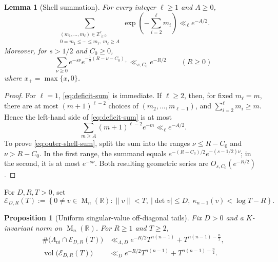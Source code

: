 \documentclass[reqno,11pt]{amsart}
\numberwithin{equation}{section}
\newtheorem{lemma}[theorem]{Lemma}
\newtheorem{proposition}[theorem]{Proposition}
\theoremstyle{definition}
\theoremstyle{remark}
\newcommand{\op}{\operatorname}
\newcommand{\M}{\op{M}}
\begin{document}
\begin{lemma}[Shell summation]\label{lem:deficit-sum}
For every integer $\ell\ge1$ and $A\ge0$,
\begin{equation}\label{eq:deficit-sum}
\sum_{\substack{(m_1,\ldots,m_\ell)\in\mathbb Z_{\ge0}^{\ell}\\
0=m_1\le\cdots\le m_\ell,\ m_\ell\ge A}}
\exp\left(-\sum_{i=2}^{\ell}m_i\right)
\ll_\ell e^{-A/2}.
\end{equation}
Moreover, for $s>1/2$ and $C_0\ge0$,
\begin{equation}\label{eq:outer-shell-sum}
\sum_{\nu\ge0}e^{-s\nu}
e^{-\frac12(R-\nu-C_0)_+}
\ll_{s,C_0}e^{-R/2}
\qquad(R\ge0)
\end{equation} where $x_+=\max\{x, 0\}$.
\end{lemma}

\begin{proof}
For $\ell=1$, \eqref{eq:deficit-sum} is immediate.  If $\ell\ge2$,
then, for fixed $m_\ell=m$, there are at most $(m+1)^{\ell-2}$ choices
of $(m_2,\ldots,m_{\ell-1})$, and
$\sum_{i=2}^{\ell}m_i\ge m$.  Hence the left-hand side of
\eqref{eq:deficit-sum} is at most
$$
\sum_{m\ge A}(m+1)^{\ell-2}e^{-m}\ll_\ell e^{-A/2}.
$$
To prove \eqref{eq:outer-shell-sum}, split the sum into the ranges
$\nu\le R-C_0$ and $\nu>R-C_0$.  In the first range, the summand equals
$e^{-(R-C_0)/2}e^{-(s-1/2)\nu}$; in the second, it is at most
$e^{-s\nu}$.  Both resulting geometric series are $O_{s,C_0}(e^{-R/2})$.
\end{proof}

For $D,R,T>0$, set
$$
\mathcal E_{D,R}(T):=
\left\{0\ne v\in\M_n(\mathbb R):
\|v\|<T,\ |\det v|\le D,\
\kappa_{n-1}(v)<\log T-R\right\}.
$$

\begin{proposition}[Uniform singular-value off-diagonal tails]
\label{prop:singular-value-cusp-tail}
Fix $D>0$ and a $K$-invariant norm on $\M_n(\mathbb R)$.  For
$R\ge1$ and $T\ge2$,
\begin{align}
\#\bigl(\Lambda_{\operatorname{ni}}\cap\mathcal E_{D,R}(T)\bigr)
&\ll_{\Lambda,D}e^{-R/2}T^{n(n-1)}+T^{n(n-1)-\frac n2},
\label{eq:singular-value-cusp-tail}\\
\operatorname{vol}\bigl(\mathcal E_{D,R}(T)\bigr)
&\ll_D e^{-R/2}T^{n(n-1)}+T^{n(n-1)-\frac n2}.
\label{eq:volume-singular-value-cusp-tail}
\end{align}
\end{proposition}
\end{document}
